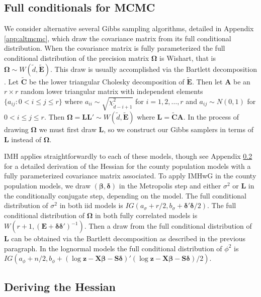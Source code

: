 \documentclass[12pt]{article}
\begin{document}
\subsection{Full conditionals for MCMC}
We consider alternative several Gibbs sampling algorithms, detailed in Appendix \ref{app:altmcmc}, which draw the covariance matrix from its full conditional distribution. When the covariance matrix is fully parameterized the full conditional distribution of the precision matrix $\bm{\Omega}$ is Wishart, that is $\bm{\Omega} \sim W(\widetilde{d}, \widetilde{\bm{E}})$. This draw is usually accomplished via the Bartlett decomposition \citep{smith1972algorithm}. Let $\widetilde{\bm{C}}$ be the lower triangular Cholesky decomposition of $\widetilde{\bm{E}}$. Then let $\bm{A}$ be an $r\times r$ random lower triangular matrix with independent elements $\{a_{ij}:0<i\le j\le r\}$ where $a_{ii} \sim \sqrt{\chi^2_{\widetilde{d} - i + 1}}$ for $i=1,2,\dots,r$ and $a_{ij} \sim N(0,1)$ for $0<i\le j\le r$. Then $\bm{\Omega} = \bm{L}\bm{L}' \sim W(\widetilde{d}, \widetilde{\bm{E}})$ where $\bm{L} = \widetilde{\bm{C}}\bm{A}$. In the process of drawing $\bm{\Omega}$ we must first draw $\bm{L}$, so we construct our Gibbs samplers in terms of $\bm{L}$ instead of $\bm{\Omega}$.

IMH applies straightforwardly to each of these models, though see Appendix \ref{subapp:hess} for a detailed derivation of the Hessian for the county population models with a fully parameterized covariance matrix associated. To apply IMHwG in the county population models, we draw $(\bm{\beta},\bm{\delta})$ in the Metropolis step and either $\sigma^2$ or $\bm{L}$ in the conditionally conjugate step, depending on the model. The full conditional distribution of $\sigma^2$ in both iid models is $IG(a_{\sigma} + r/2, b_{\sigma} + \bm{\delta}'\bm{\delta}/2)$. The full conditional distribution of $\bm{\Omega}$ in both fully correlated models is $W(r + 1, (\bm{E} + \bm{\delta}\bm{\delta}')^{-1})$. Then a draw from the full conditional distribution of $\bm{L}$ can be obtained via the Bartlett decomposition as described in the previous paragraph. In the lognormal models the full conditional distribution of $\phi^2$ is $IG(a_{\phi} + n/2, b_{\phi} + (\log \bm{z} - \bm{X}\bm{\beta} - \bm{S}\bm{\delta})'(\log \bm{z} - \bm{X}\bm{\beta} - \bm{S}\bm{\delta})/2)$. 

\subsection{Deriving the Hessian}\label{subapp:hess}
\end{document}
